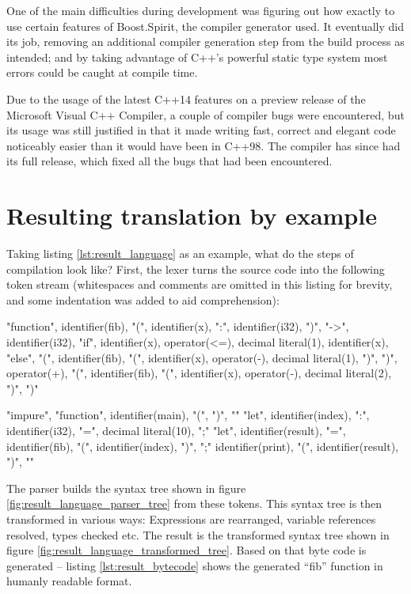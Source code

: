 One of the main difficulties during development was figuring out how exactly to use certain features of Boost.Spirit, the compiler generator used. It eventually did its job, removing an additional compiler generation step from the build process as intended; and by taking advantage of C++'s powerful static type system most errors could be caught at compile time.

Due to the usage of the latest C++14 features on a preview release of the Microsoft Visual C++ Compiler, a couple of compiler bugs were encountered, but its usage was still justified in that it made writing fast, correct and elegant code noticeably easier than it would have been in C++98. The compiler has since had its full release, which fixed all the bugs that had been encountered.


\section{Resulting translation by example}

Taking listing \ref{lst:result_language} as an example, what do the steps of compilation look like? First, the lexer turns the source code into the following token stream (whitespaces and comments are omitted in this listing for brevity, and some indentation was added to aid comprehension):

\begin{codelisting}[caption="Abridged tokens of listing \ref{lst:result_language}"]
"function", identifier(fib), "(", identifier(x), ":", identifier(i32), ")", "->", identifier(i32),
    "if", identifier(x), operator(<=), decimal literal(1),
        identifier(x),
    "else",
        "(", identifier(fib), "(", identifier(x), operator(-), decimal literal(1), ")", ")", operator(+), "(", identifier(fib), "(", identifier(x), operator(-), decimal literal(2), ")", ")"

"impure", "function", identifier(main), "(", ")",
"{"
    "let", identifier(index), ":", identifier(i32), "=", decimal literal(10), ";"
    "let", identifier(result), "=", identifier(fib), "(", identifier(index), ")", ";"
    identifier(print), "(", identifier(result), ")",
"}"
\end{codelisting}

The parser builds the syntax tree shown in figure \ref{fig:result_language_parser_tree} from these tokens. This syntax tree is then transformed in various ways: Expressions are rearranged, variable references resolved, types checked etc. The result is the transformed syntax tree shown in figure \ref{fig:result_language_transformed_tree}. Based on that byte code is generated -- listing \ref{lst:result_bytecode} shows the generated ``fib'' function in humanly readable format.

